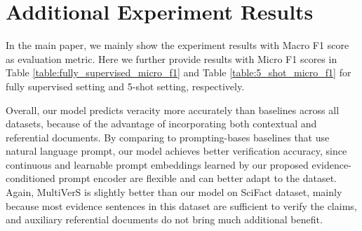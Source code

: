 \section{Additional Experiment Results}
\label{sec:additional_experiments}

In the main paper, we mainly show the experiment results with Macro F1 score as evaluation metric. Here we further provide results with Micro F1 scores in Table \ref{table:fully_supervised_micro_f1} and Table \ref{table:5_shot_micro_f1} for fully supervised setting and 5-shot setting, respectively.

Overall, our model predicts veracity more accurately than baselines across all datasets, because of the advantage of incorporating both contextual and referential documents. By comparing to prompting-bases baselines that use natural language prompt, our model achieves better verification accuracy, since continuous and learnable prompt embeddings learned by our proposed evidence-conditioned prompt encoder are flexible and can better adapt to the dataset. Again, MultiVerS is slightly better than our model on SciFact dataset, mainly because most evidence sentences in this dataset are sufficient to verify the claims, and auxiliary referential documents do not bring much additional benefit.

